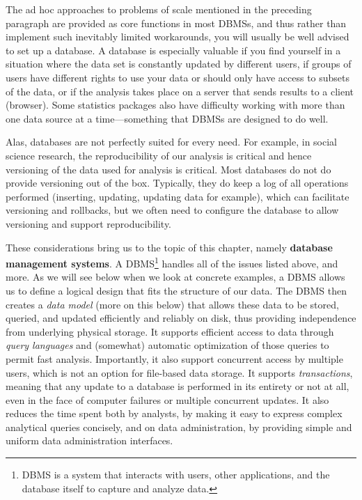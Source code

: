 \documentclass[]{krantz}
\begin{document}
The ad hoc approaches to problems of scale mentioned in the preceding
paragraph are provided as core functions in most DBMSs, and thus rather
than implement such inevitably limited workarounds, you will usually be
well advised to set up a database. A database is especially valuable if
you find yourself in a situation where the data set is constantly
updated by different users, if groups of users have different rights to
use your data or should only have access to subsets of the data, or if
the analysis takes place on a server that sends results to a client
(browser). Some statistics packages also have difficulty working with
more than one data source at a time---something that DBMSs are designed
to do well.

Alas, databases are not perfectly suited for every need. For example, in
social science research, the reproducibility of our analysis is critical
and hence versioning of the data used for analysis is critical. Most
databases do not do provide versioning out of the box. Typically, they
do keep a log of all operations performed (inserting, updating, updating
data for example), which can facilitate versioning and rollbacks, but we
often need to configure the database to allow versioning and support
reproducibility.

These considerations bring us to the topic of this chapter, namely
\textbf{database management systems}. A DBMS\footnote{DBMS is a system
  that interacts with users, other applications, and the database itself
  to capture and analyze data.} handles all of the issues listed above,
and more. As we will see below when we look at concrete examples, a DBMS
allows us to define a logical design that fits the structure of our
data. The DBMS then creates a \emph{data model} (more on this below)
that allows these data to be stored, queried, and updated efficiently
and reliably on disk, thus providing independence from underlying
physical storage. It supports efficient access to data through
\emph{query languages} and (somewhat) automatic optimization of those
queries to permit fast analysis. Importantly, it also support concurrent
access by multiple users, which is not an option for file-based data
storage. It supports \emph{transactions}, meaning that any update to a
database is performed in its entirety or not at all, even in the face of
computer failures or multiple concurrent updates. It also reduces the
time spent both by analysts, by making it easy to express complex
analytical queries concisely, and on data administration, by providing
simple and uniform data administration interfaces.
\end{document}
